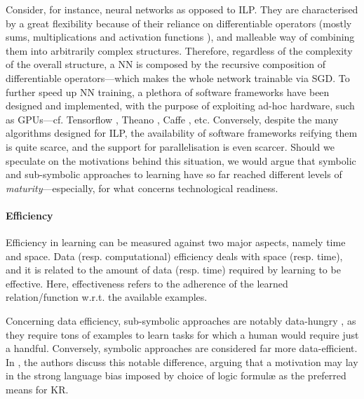 \documentclass[12pt,a4paper,openright,twoside]{book}
\begin{document}
Consider, for instance, neural networks as opposed to ILP.
%
They are characterised by a great flexibility because of their reliance on differentiable operators (mostly sums, multiplications and activation functions \cite{enwiki:ActivationFunctions}), and malleable way of combining them into arbitrarily complex structures.
%
Therefore, regardless of the complexity of the overall structure, a NN is composed by the recursive composition of differentiable operators---which makes the whole network trainable via SGD.
%
To further speed up NN training, a plethora of software frameworks have been designed and implemented, with the purpose of exploiting ad-hoc hardware, such as GPUs---cf. Tensorflow \cite{tensorflow2015-whitepaper}, Theano \cite{theano2016}, Caffe \cite{JiaSDKLGGD14}, etc.
%
Conversely, despite the many algorithms designed for ILP, the availability of software frameworks reifying them is quite scarce, and the support for parallelisation is even scarcer.
%
Should we speculate on the motivations behind this situation, we would argue that symbolic and sub-symbolic approaches to learning have so far reached different levels of \emph{maturity}---especially, for what concerns technological readiness.


\paragraph{Efficiency}

Efficiency in learning can be measured against two major aspects, namely time and space.
%
Data (resp. computational) efficiency deals with space (resp. time), and it is related to the amount of data (resp. time) required by learning to be effective.
%
%
Here, effectiveness refers to the adherence of the learned relation/function w.r.t. the available examples.

Concerning data efficiency, sub-symbolic approaches are notably data-hungry \cite{Adadi21}, as they require tons of examples to learn tasks for which a human would require just a handful.
%
Conversely, symbolic approaches are considered far more data-efficient.
%
In \cite{EvansG18}, the authors discuss this notable difference, arguing that a motivation may lay in the strong language bias imposed by choice of logic formul\ae{} as the preferred means for KR.
\end{document}
